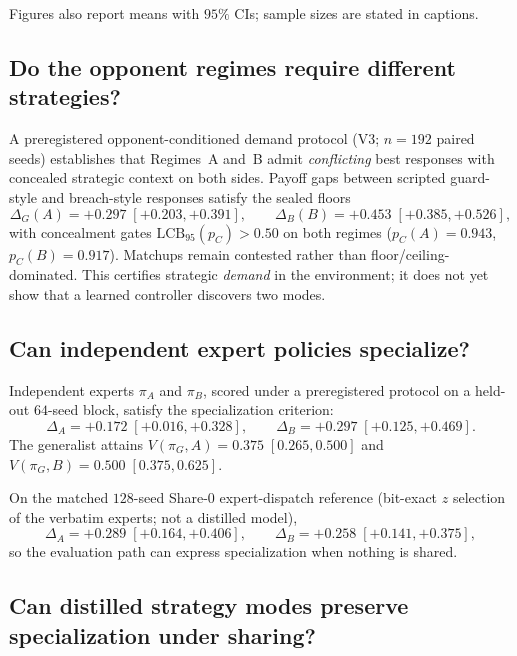 \documentclass{article}
\begin{document}
\noindent
Figures also report means with $95\%$ CIs; sample sizes are stated in captions.

\subsection{Do the opponent regimes require different strategies?}

A preregistered opponent-conditioned demand protocol (V3; $n{=}192$ paired seeds)
establishes that Regimes~A and~B admit \emph{conflicting} best responses with
concealed strategic context on both sides. Payoff gaps between scripted
guard-style and breach-style responses satisfy the sealed floors
\[
\Delta_G(A)=+0.297\;[+0.203,+0.391],
\qquad
\Delta_B(B)=+0.453\;[+0.385,+0.526],
\]
with concealment gates $\mathrm{LCB}_{95}(p_C)>0.50$ on both regimes
($p_C(A)=0.943$, $p_C(B)=0.917$). Matchups remain contested rather than
floor/ceiling-dominated. This certifies strategic \emph{demand} in the
environment; it does not yet show that a learned controller discovers two modes.

\subsection{Can independent expert policies specialize?}

Independent experts $\pi_A$ and $\pi_B$, scored under a preregistered protocol
on a held-out $64$-seed block, satisfy the specialization criterion:
\[
\Delta_A = +0.172\;[+0.016,+0.328],
\qquad
\Delta_B = +0.297\;[+0.125,+0.469].
\]
The generalist attains
$V(\pi_G,A)=0.375\;[0.265,0.500]$ and
$V(\pi_G,B)=0.500\;[0.375,0.625]$.

On the matched $128$-seed Share-0 expert-dispatch reference (bit-exact $z$
selection of the verbatim experts; not a distilled model),
\[
\Delta_A = +0.289\;[+0.164,+0.406],
\qquad
\Delta_B = +0.258\;[+0.141,+0.375],
\]
so the evaluation path can express specialization when nothing is shared.

\subsection{Can distilled strategy modes preserve specialization under sharing?}
\end{document}
